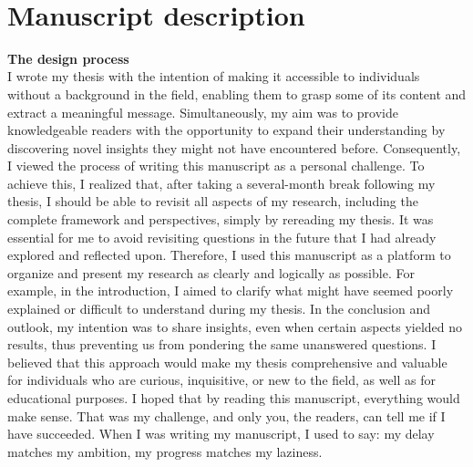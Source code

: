 
\newpage
~
\newpage




\newpage

\chapter{Manuscript description}




\newpage


{\noindent\Large\textbf{The design process}}
\\


I wrote my thesis with the intention of making it accessible to individuals without a background in the field, enabling them to grasp some of its content and extract a meaningful message. Simultaneously, my aim was to provide knowledgeable readers with the opportunity to expand their understanding by discovering novel insights they might not have encountered before. Consequently, I viewed the process of writing this manuscript as a personal challenge. To achieve this, I realized that, after taking a several-month break following my thesis, I should be able to revisit all aspects of my research, including the complete framework and perspectives, simply by rereading my thesis. It was essential for me to avoid revisiting questions in the future that I had already explored and reflected upon. Therefore, I used this manuscript as a platform to organize and present my research as clearly and logically as possible. For example, in the introduction, I aimed to clarify what might have seemed poorly explained or difficult to understand during my thesis. In the conclusion and outlook, my intention was to share insights, even when certain aspects yielded no results, thus preventing us from pondering the same unanswered questions. I believed that this approach would make my thesis comprehensive and valuable for individuals who are curious, inquisitive, or new to the field, as well as for educational purposes. I hoped that by reading this manuscript, everything would make sense. That was my challenge, and only you, the readers, can tell me if I have succeeded. When I was writing my manuscript, I used to say: my delay matches my ambition, my progress matches my laziness.
\\

